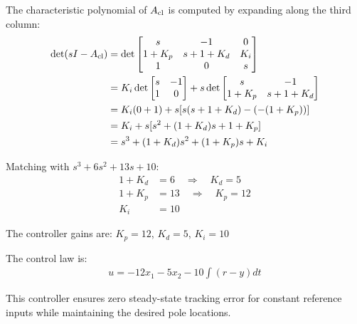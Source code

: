 \documentclass[11pt,a4paper]{article}
\begin{document}
The characteristic polynomial of $A_{\text{cl}}$ is computed by expanding along the third column:
\begin{align}
  \det(sI - A_{\text{cl}}) &= \det\begin{bmatrix} s & -1 & 0 \\ 1+K_p & s+1+K_d & K_i \\ 1 & 0 & s \end{bmatrix} \\
  &= K_i \det\begin{bmatrix} s & -1 \\ 1 & 0 \end{bmatrix} + s\det\begin{bmatrix} s & -1 \\ 1+K_p & s+1+K_d \end{bmatrix} \\
  &= K_i(0 + 1) + s[s(s+1+K_d) - (-(1+K_p))] \\
  &= K_i + s[s^2 + (1+K_d)s + 1 + K_p] \\
  &= s^3 + (1+K_d)s^2 + (1+K_p)s + K_i
\end{align}

Matching with $s^3 + 6s^2 + 13s + 10$:
\begin{align}
  1 + K_d &= 6 \quad \Rightarrow \quad K_d = 5 \\
  1 + K_p &= 13 \quad \Rightarrow \quad K_p = 12 \\
  K_i &= 10
\end{align}

The controller gains are: $K_p = 12$, $K_d = 5$, $K_i = 10$

The control law is:
\begin{align}
  u = -12x_1 - 5x_2 - 10\int(r-y)dt
\end{align}

This controller ensures zero steady-state tracking error for constant reference inputs while maintaining the desired pole locations.
\end{document}
